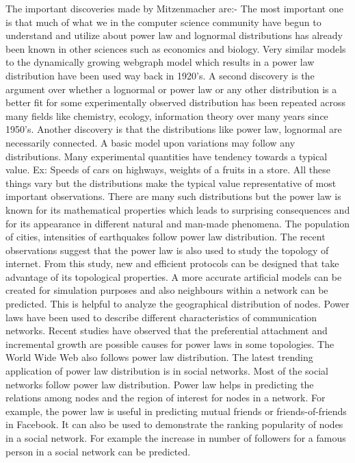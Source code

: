 The important discoveries made by Mitzenmacher are:-
The most important one is that much of what we in the computer science community have begun to understand and utilize about power law and lognormal distributions has already been known in other sciences such as economics and biology. Very similar models to the dynamically growing webgraph model which results in a power law distribution have been used way back in 1920's.
A second discovery is the argument over whether a lognormal or power law or any other distribution is a better fit for some experimentally observed distribution has been repeated across many fields like chemistry, ecology, information theory over many years since 1950's.
Another discovery is that the distributions like power law, lognormal are necessarily connected. A basic model upon variations may follow any distributions. \cite{mitzenmacher2004brief}
Many experimental quantities have tendency towards a typical value. Ex: Speeds of cars on highways, weights of a fruits in a store. All these things vary but the distributions make the typical value representative of most important observations. There are many such distributions but the power law is known for its mathematical properties which leads to surprising consequences and for its appearance in different natural and man-made phenomena. The population of cities, intensities of earthquakes follow power law distribution. \cite{clauset2009power}
The recent observations suggest that the power law is also used to study the topology of internet. From this study, new and efficient protocols can be designed that take advantage of its topological properties. A more accurate artificial models can be created for simulation purposes and also neighbours within a network can be predicted. This is helpful to analyze the geographical distribution of nodes. Power laws have been used to describe different characteristics of communication networks. Recent studies have observed that the preferential attachment and incremental growth are possible causes for power laws in some topologies. The World Wide Web also follows power law distribution. \cite{medina2000origin}
The latest trending application of power law distribution is in social networks. Most of the social networks follow power law distribution. Power law helps in predicting the relations among nodes and the region of interest for nodes in a network. For example, the power law is useful in predicting mutual friends or friends-of-friends in Facebook. It can also be used to demonstrate the ranking popularity of nodes in a social network. For example the increase in number of followers for a famous person in a social network can be predicted.
